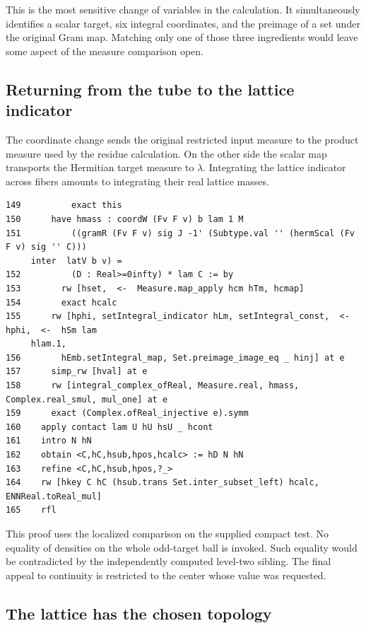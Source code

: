 \documentclass[12pt,letterpaper]{article}
\begin{document}
This is the most sensitive change of variables in the calculation. It simultaneously identifies a scalar target, six integral coordinates, and the preimage of a set under the original Gram map. Matching only one of those three ingredients would leave some aspect of the measure comparison open.
\clearpage{}\subsection*{Returning from the tube to the lattice indicator}
The coordinate change sends the original restricted input measure to the product measure used by the residue calculation. On the other side the scalar map transports the Hermitian target measure to $\lambda$. Integrating the lattice indicator across fibers amounts to integrating their real lattice masses.
\par
{\fontsize{8.8}{10.5}\selectfont\begin{verbatim}
149          exact this
150      have hmass : coordW (Fv F v) b lam 1 M
151          ((gramR (Fv F v) sig J -1' (Subtype.val '' (hermScal (Fv F v) sig '' C)))
     inter  latV b v) =
152          (D : Real>=0infty) * lam C := by
153        rw [hset,  <-  Measure.map_apply hcm hTm, hcmap]
154        exact hcalc
155      rw [hphi, setIntegral_indicator hLm, setIntegral_const,  <-  hphi,  <-  hSm lam
     hlam.1,
156        hEmb.setIntegral_map, Set.preimage_image_eq _ hinj] at e
157      simp_rw [hval] at e
158      rw [integral_complex_ofReal, Measure.real, hmass, Complex.real_smul, mul_one] at e
159      exact (Complex.ofReal_injective e).symm
160    apply contact lam U hU hsU _ hcont
161    intro N hN
162    obtain <C,hC,hsub,hpos,hcalc> := hD N hN
163    refine <C,hC,hsub,hpos,?_>
164    rw [hkey C hC (hsub.trans Set.inter_subset_left) hcalc, ENNReal.toReal_mul]
165    rfl
\end{verbatim}}
This proof uses the localized comparison on the supplied compact test. No equality of densities on the whole odd-target ball is invoked. Such equality would be contradicted by the independently computed level-two sibling. The final appeal to continuity is restricted to the center whose value was requested.
\clearpage{}\subsection*{The lattice has the chosen topology}
\end{document}
